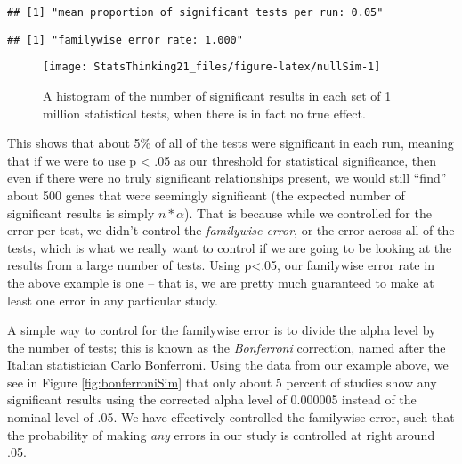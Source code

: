 \documentclass[]{book}
\newenvironment{Shaded}{\begin{snugshade}}{\end{snugshade}}
\newcommand{\KeywordTok}[1]{\textcolor[rgb]{0.13,0.29,0.53}{\textbf{#1}}}
\newcommand{\DecValTok}[1]{\textcolor[rgb]{0.00,0.00,0.81}{#1}}
\newcommand{\StringTok}[1]{\textcolor[rgb]{0.31,0.60,0.02}{#1}}
\newcommand{\CommentTok}[1]{\textcolor[rgb]{0.56,0.35,0.01}{\textit{#1}}}
\newcommand{\OperatorTok}[1]{\textcolor[rgb]{0.81,0.36,0.00}{\textbf{#1}}}
\newcommand{\NormalTok}[1]{#1}
\theoremstyle{definition}
\theoremstyle{definition}
\theoremstyle{definition}
\theoremstyle{remark}
\begin{document}
\begin{verbatim}
## [1] "mean proportion of significant tests per run: 0.05"
\end{verbatim}

\begin{Shaded}
\end{Shaded}

\begin{verbatim}
## [1] "familywise error rate: 1.000"
\end{verbatim}

\begin{figure}
\texttt{[image: StatsThinking21\_files/figure-latex/nullSim-1]} \caption{A histogram of the number of significant results in each set of 1 million statistical tests, when there is in fact no true effect.}\label{fig:nullSim}
\end{figure}

This shows that about 5\% of all of the tests were significant in each
run, meaning that if we were to use p \textless{} .05 as our threshold
for statistical significance, then even if there were no truly
significant relationships present, we would still ``find'' about 500
genes that were seemingly significant (the expected number of
significant results is simply \(n * \alpha\)). That is because while we
controlled for the error per test, we didn't control the
\emph{familywise error}, or the error across all of the tests, which is
what we really want to control if we are going to be looking at the
results from a large number of tests. Using p\textless{}.05, our
familywise error rate in the above example is one -- that is, we are
pretty much guaranteed to make at least one error in any particular
study.

A simple way to control for the familywise error is to divide the alpha
level by the number of tests; this is known as the \emph{Bonferroni}
correction, named after the Italian statistician Carlo Bonferroni. Using
the data from our example above, we see in Figure
\ref{fig:bonferroniSim} that only about 5 percent of studies show any
significant results using the corrected alpha level of 0.000005 instead
of the nominal level of .05. We have effectively controlled the
familywise error, such that the probability of making \emph{any} errors
in our study is controlled at right around .05.
\end{document}
